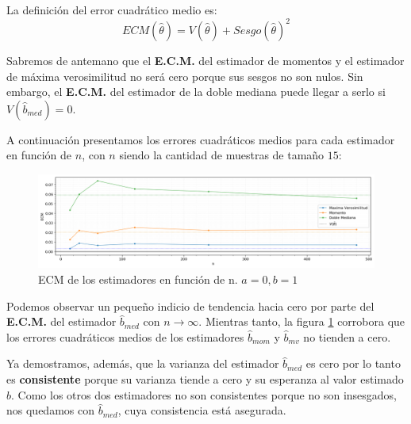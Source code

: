 La definición del error cuadrático medio es:
\begin{displaymath}
	ECM(\hat{\theta}) = V(\hat{\theta}) + Sesgo(\hat{\theta})^2
\end{displaymath}

Sabremos de antemano que el \textbf{E.C.M.} del estimador de momentos y el estimador de máxima verosimilitud no será cero porque sus sesgos no son nulos. Sin embargo, el \textbf{E.C.M.} del estimador de la doble mediana puede llegar a serlo si $V(\hat{b}_{med}) = 0$.

\vskip 8pt

A continuación presentamos los errores cuadráticos medios para cada estimador en función de $n$, con $n$ siendo la cantidad de muestras de tamaño $15$:

\begin{figure}[H]
	\centering
	\includegraphics[width=1\textwidth]{imagenes/ecm-en-f-de-n.png}
	\caption{\footnotesize ECM de los estimadores en función de n. $a=0, b=1$}
	\label{fig:ej7-ecm-en-f-de-n}
\end{figure}

Podemos observar un pequeño indicio de tendencia hacia cero por parte del \textbf{E.C.M.} del estimador $\hat{b}_{med}$ con $n \to \infty$. Mientras tanto, la figura \ref{fig:ej7-ecm-en-f-de-n} corrobora que los errores cuadráticos medios de los estimadores $\hat{b}_{mom}$ y $\hat{b}_{mv}$ no tienden a cero.

\vskip 8pt

Ya demostramos, además, que la varianza del estimador $\hat{b}_{med}$ es cero por lo tanto es \textbf{consistente} porque su varianza tiende a cero y su esperanza al valor estimado $b$. Como los otros dos estimadores no son consistentes porque no son insesgados, nos quedamos con $\hat{b}_{med}$, cuya consistencia está asegurada.